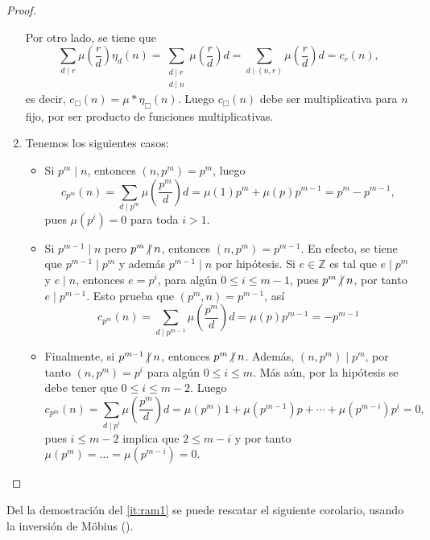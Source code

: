 \begin{proof}
\begin{enumerate}[label=\textnormal{(\arabic*)}]
Por otro lado, se tiene que
\begin{equation*}
    \sum_{d \mid r} \mu \left( \frac{r}{d} \right) \eta_d(n) = \sum_{\substack{d \mid r \\ d \mid n}} \mu \left( \frac{r}{d} \right) d = \sum_{d \mid (n,r)} \mu \left( \frac{r}{d} \right) d = c_r(n),
\end{equation*}
es decir, $c_\Box(n)=\mu*\eta_\Box(n)$. Luego $c_\Box(n)$ debe ser multiplicativa para $n$ fijo, por ser producto de funciones multiplicativas.
\item Tenemos los siguientes casos:
\begin{itemize}
\item Si $p^m \mid n$, entonces $(n,p^m)=p^m$, luego
    \begin{equation*}
        c_{p^m}(n) = \sum_{d \mid p^m} \mu \left( \frac{p^m}{d} \right) d = \mu(1) p^m + \mu(p) p^{m-1} = p^m - p^{m-1},
    \end{equation*}
    pues $\mu(p^i)=0$ para toda $i > 1$.
\item Si $p^{m-1} \mid n$ pero $p^m \centernot\mid n$, entonces $(n,p^m)=p^{m-1}$. En efecto, se tiene que $p^{m-1} \mid p^m$ y además $p^{m-1} \mid n$ por hipótesis. Si $e \in \mathbb{Z}$ es tal que $e \mid p^{m}$ y $e \mid n$, entonces $e=p^i$, para algún $0 \le i \le m-1$, pues $p^m \centernot\mid n$, por tanto $e \mid p^{m-1}$. Esto prueba que $(p^m,n)=p^{m-1}$, así
    \begin{equation*}
        c_{p^m}(n) = \sum_{d \mid p^{m-1}} \mu \left( \frac{p^m}{d} \right) d = \mu(p) p^{m-1} = -p^{m-1}
    \end{equation*}
    
\item Finalmente, si $p^{m-1} \centernot\mid n$, entonces $p^m \centernot\mid n$. Además, $(n,p^m) \mid p^m$, por tanto $(n,p^m)=p^i$ para algún $0 \le i \le m$. Más aún, por la hipótesis se debe tener que $0 \le i \le m-2$. Luego
    \begin{equation*}
        c_{p^m}(n) = \sum_{d \mid p^i} \mu \left( \frac{p^m}{d} \right) d = \mu(p^m)1+ \mu(p^{m-1}) p + \cdots + \mu(p^{m-i}) p^i = 0,
    \end{equation*}
    pues $i \le m-2$ implica que $2 \le m-i$ y por tanto $\mu(p^m)=\ldots=\mu(p^{m-i})=0$.
\end{itemize}
\end{enumerate}
\end{proof}

Del la demostración del \cref{it:ram1} se puede rescatar el siguiente corolario, usando la inversión de Möbius ().


